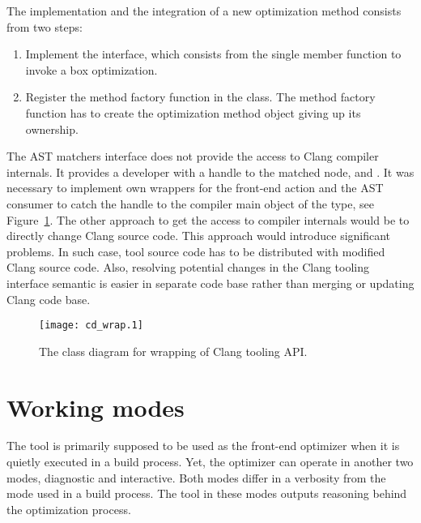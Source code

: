 The implementation and the integration of a new optimization method consists from two steps:
\begin{enumerate}
\item Implement the  interface, which consists from the single member function to invoke a box optimization.
\item Register the method factory function in the  class. The method factory function has to create the optimization method object giving up its ownership.
\end{enumerate}

The AST matchers interface does not provide the access to Clang compiler internals. It provides a developer with a handle to the matched node,  and . It was necessary to implement own wrappers for the front-end action and the AST consumer to catch the handle to the compiler main object of the  type, see Figure~\ref{class-interface}. The other approach to get the access to compiler internals would be to directly change Clang source code. This approach would introduce significant problems. In such case, tool source code has to be distributed with modified Clang source code. Also, resolving potential changes in the Clang tooling interface semantic is easier in separate code base rather than merging or updating Clang code base.

\begin{figure}[h!]
\caption{The class diagram for wrapping of Clang tooling API.}
\label{class-interface}
\vspace{0.5cm}
\centering
\texttt{[image: cd\_wrap.1]}
\end{figure}

\section{Working modes}
The tool is primarily supposed to be used as the front-end optimizer when it is quietly executed in a build process. Yet, the optimizer can operate in another two modes, diagnostic and interactive. Both modes differ in a verbosity from the mode used in a build process. The tool in these modes outputs reasoning behind the optimization process.

